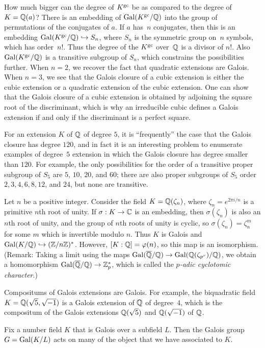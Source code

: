 How much bigger can the degree of $K^{\operatorname{gc}}$ be as compared to the
degree of $K=\mathbb{Q}(a)$? There is an embedding of
$\operatorname{Gal}(K^{\operatorname{gc}}/\mathbb{Q})$ into the group of permutations of the conjugates of
$a$.  If $a$ has~$n$ conjugates, then this is an embedding
$\operatorname{Gal}(K^{\operatorname{gc}}/\mathbb{Q})\hookrightarrow S_n$, where $S_n$ is the symmetric group on~$n$
symbols, which has order~$n!$.  Thus the degree of the $K^{\operatorname{gc}}$ over~$\mathbb{Q}$
is a divisor of $n!$. Also $\operatorname{Gal}(K^{\operatorname{gc}}/\mathbb{Q})$ is a transitive
subgroup of $S_n$, which constrains the possibilities further.  When
$n=2$, we recover the fact that quadratic extensions are Galois.  When
$n=3$, we see that the Galois closure of a cubic extension is either
the cubic extension or a quadratic extension of the cubic extension.
One can show that the Galois closure of a cubic extension is obtained
by adjoining the square root of the discriminant, which is why an
irreducible cubic defines a Galois extension if and only if the discriminant
is a perfect square.


For an extension
$K$ of $\mathbb{Q}$ of degree $5$, it is ``frequently'' the case that the Galois
closure has degree $120$, and in fact it is an
interesting problem to enumerate examples of degree~$5$ extension in which
the Galois closure has degree smaller than $120$.
For example, the only possibilities for the order of a transitive proper subgroup
of $S_5$ are $5$, $10$, $20$, and $60$; there are also
proper subgroups of $S_5$ order $2, 3, 4, 6, 8, 12$, and $24$, but none
are transitive.

Let $n$ be a positive integer.  Consider the field $K=\mathbb{Q}(\zeta_n)$,
where $\zeta_n=e^{2\pi i/n}$ is a primitive $n$th root of unity.  If
$\sigma:K\to \mathbb{C}$ is an embedding, then $\sigma(\zeta_n)$ is also an
$n$th root of unity, and the group of $n$th roots of unity is cyclic,
so $\sigma(\zeta_n) = \zeta_n^m$ for some $m$ which is invertible
modulo $n$.  Thus $K$ is Galois and $\operatorname{Gal}(K/\mathbb{Q})\hookrightarrow (\mathbb{Z}/n\mathbb{Z})^*$.
However, $[K:\mathbb{Q}]=\varphi(n)$, so this map is an isomorphism.  (Remark:
Taking a limit using the maps $\operatorname{Gal}(\overline{\mathbb{Q}}/\mathbb{Q})\to
\operatorname{Gal}(\mathbb{Q}(\zeta_{p^r})/\mathbb{Q})$, we obtain a homomorphism $\operatorname{Gal}(\overline{\mathbb{Q}}/\mathbb{Q})\to
\mathbb{Z}_p^*$, which is called the {\em $p$-adic cyclotomic character}.)

Compositums of Galois extensions are Galois.  For example, the
biquadratic field $K=\mathbb{Q}(\sqrt{5},\sqrt{-1})$ is a Galois
extension of $\mathbb{Q}$ of degree~$4$, which is the compositum
of the Galois extensions $\mathbb{Q}(\sqrt{5})$ and $\mathbb{Q}(\sqrt{-1})$ of $\mathbb{Q}$.

Fix a number field $K$ that is Galois over a subfield
$L$. Then the Galois group $G=\operatorname{Gal}(K/L)$ acts on many
of the object that we have associated to $K$.

